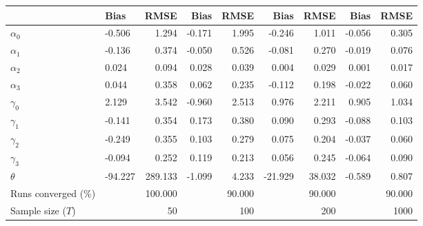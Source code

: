 
\begin{tabular}[t]{llrrrrrrr}
\toprule
  & Bias & RMSE & Bias & RMSE & Bias & RMSE & Bias & RMSE\\
\midrule
$\alpha_{0}$ & -0.506 & 1.294 & -0.171 & 1.995 & -0.246 & 1.011 & -0.056 & 0.305\\
$\alpha_{1}$ & -0.136 & 0.374 & -0.050 & 0.526 & -0.081 & 0.270 & -0.019 & 0.076\\
$\alpha_{2}$ & 0.024 & 0.094 & 0.028 & 0.039 & 0.004 & 0.029 & 0.001 & 0.017\\
$\alpha_{3}$ & 0.044 & 0.358 & 0.062 & 0.235 & -0.112 & 0.198 & -0.022 & 0.060\\
$\gamma_{0}$ & 2.129 & 3.542 & -0.960 & 2.513 & 0.976 & 2.211 & 0.905 & 1.034\\
$\gamma_{1}$ & -0.141 & 0.354 & 0.173 & 0.380 & 0.090 & 0.293 & -0.088 & 0.103\\
$\gamma_{2}$ & -0.249 & 0.355 & 0.103 & 0.279 & 0.075 & 0.204 & -0.037 & 0.060\\
$\gamma_{3}$ & -0.094 & 0.252 & 0.119 & 0.213 & 0.056 & 0.245 & -0.064 & 0.090\\
$\theta$ & -94.227 & 289.133 & -1.099 & 4.233 & -21.929 & 38.032 & -0.589 & 0.807\\
Runs converged (\%) &  & 100.000 &  & 90.000 &  & 90.000 &  & 90.000\\
Sample size ($T$) &  & 50 &  & 100 &  & 200 &  & 1000\\
\bottomrule
\end{tabular}
